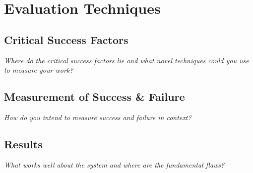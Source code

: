 \documentclass{article}
\begin{document}
\section{Evaluation Techniques}
\subsection{Critical Success Factors}
\textit{Where do the critical success factors lie and what novel techniques could you use to measure your work?}

\subsection{Measurement of Success \& Failure}
\textit{How do you intend to measure success and failure in context? }

\subsection{Results}
\textit{ What works well about the system and where are the fundamental flaws?}
\end{document}
